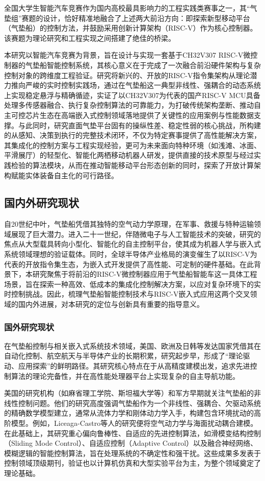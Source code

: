 全国大学生智能汽车竞赛作为国内高校最具影响力的工程实践类赛事之一，其“气垫组”赛题的设计，恰好精准地融合了上述两大前沿方向：即探索新型移动平台（气垫船）的控制方法，并鼓励采用创新计算架构（RISC-V）作为核心控制器。该赛题为理论研究和工程实现之间搭建了绝佳的桥梁。

本研究以智能汽车竞赛为背景，旨在设计与实现一套基于CH32V307 RISC-V微控制器的气垫船智能控制系统，其核心意义在于完成了一次融合前沿硬件架构与复杂控制对象的跨维度工程验证。研究将新兴的、开放的RISC-V指令集架构从理论潜力推向严峻的实时控制实践场，通过在气垫船这一典型非线性、强耦合的动态系统上实现稳定悬浮与精确循迹，实证了以CH32V307为代表的国产RISC-V MCU具备处理多传感器融合、执行复杂控制算法的可靠能力，为打破传统架构垄断、推动自主可控芯片生态在高端嵌入式控制领域落地提供了关键性的应用案例与性能数据支撑。与此同时，研究直面气垫平台固有的操纵性差、稳定性弱的核心挑战，所构建的从感知、决策到执行的完整技术闭环，不仅为特定赛事提供了高性能解决方案，其集成化的控制方案与工程实现经验，更可为未来面向特种环境（如浅滩、冰面、平滑展厅）的轻型化、智能化两栖移动机器人研发，提供直接的技术原型与经过实践检验的算法模块，从而在推动智能移动平台形态创新的同时，探索了开放计算架构赋能实体装备自主化的可行路径。

\subsection{国内外研究现状}
自20世纪中叶，气垫船凭借其独特的空气动力学原理，在军事、救援与特种运输领域展现了巨大潜力。进入二十一世纪，伴随微电子与人工智能技术的突破，研究的焦点从大型载具转向小型化、智能化的自主控制平台，使其成为机器人学与嵌入式系统领域理想的验证载体。同时，全球半导体产业格局的演变催生了以RISC-V为代表的开放指令集生态，为嵌入式开发提供了高性能、可定制的硬件基础。在此背景下，本研究聚焦于将前沿的RISC-V微控制器应用于气垫船智能车这一具体工程场景，旨在探索一种高效、低成本的集成化控制解决方案，以应对复杂环境下的实时控制挑战。因此，梳理气垫船智能控制技术与RISC-V嵌入式应用这两个交叉领域的国内外进展，对本研究的定位与创新具有重要的指导意义。
\subsubsection{国外研究现状}
在气垫船控制与相关嵌入式系统技术领域，美国、欧洲及日韩等发达国家凭借其在自动化控制、航空航天与半导体产业的长期积累，研究起步早，形成了“理论驱动、应用探索”的鲜明路径。其研究核心特点在于从高精度建模出发，追求先进控制算法的理论完备性，并在高性能处理器平台上实现复杂的自主导航功能。

美国的研究机构（如麻省理工学院、斯坦福大学等）和军方早期就关注气垫船的非线性控制问题。他们的研究高度强调气垫船作为一个非线性、强耦合、欠驱动系统的精确数学模型建立，通常从流体力学和刚体动力学入手，构建包含环境扰动的高阶模型。例如，Liceaga-Castro等人的研究便将空气动力学与海面扰动耦合建模。在此基础上，其研究重心偏向鲁棒性、自适应的先进控制算法，如滑模变结构控制（Sliding Mode Control）、自适应控制（Adaptive Control）以及融合神经网络、模糊逻辑的智能控制算法，旨在处理系统的不确定性和强干扰。这些成果多发表于控制领域顶级期刊，验证也以计算机仿真和大型实验平台为主，为整个领域奠定了理论基础。

